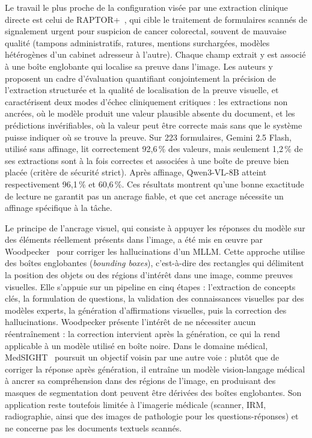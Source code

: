 Le travail le plus proche de la configuration visée par une extraction clinique directe est celui de RAPTOR+~\cite{raptorplus2026}, qui cible le traitement de formulaires scannés de signalement urgent pour suspicion de cancer colorectal, souvent de mauvaise qualité (tampons administratifs, ratures, mentions surchargées, modèles hétérogènes d'un cabinet adresseur à l'autre). Chaque champ extrait y est associé à une boîte englobante qui localise sa preuve dans l'image. Les auteurs y proposent un cadre d'évaluation quantifiant conjointement la précision de l'extraction structurée et la qualité de localisation de la preuve visuelle, et caractérisent deux modes d'échec cliniquement critiques : les extractions non ancrées, où le modèle produit une valeur plausible absente du document, et les prédictions invérifiables, où la valeur peut être correcte mais sans que le système puisse indiquer où se trouve la preuve. Sur 223 formulaires, Gemini 2.5 Flash, utilisé sans affinage, lit correctement 92,6\,\% des valeurs, mais seulement 1,2\,\% de ses extractions sont à la fois correctes et associées à une boîte de preuve bien placée (critère de sécurité strict). Après affinage, Qwen3-VL-8B atteint respectivement 96,1\,\% et 60,6\,\%. Ces résultats montrent qu'une bonne exactitude de lecture ne garantit pas un ancrage fiable, et que cet ancrage nécessite un affinage spécifique à la tâche.

Le principe de l'ancrage visuel, qui consiste à appuyer les réponses du modèle sur des éléments réellement présents dans l'image, a été mis en œuvre par Woodpecker~\cite{woodpecker2023} pour corriger les hallucinations d'un MLLM. Cette approche utilise des boîtes englobantes (\textit{bounding boxes}), c'est-à-dire des rectangles qui délimitent la position des objets ou des régions d'intérêt dans une image, comme preuves visuelles. Elle s'appuie sur un pipeline en cinq étapes : l'extraction de concepts clés, la formulation de questions, la validation des connaissances visuelles par des modèles experts, la génération d'affirmations visuelles, puis la correction des hallucinations. Woodpecker présente l'intérêt de ne nécessiter aucun réentraînement : la correction intervient après la génération, ce qui la rend applicable à un modèle utilisé en boîte noire. Dans le domaine médical, MedSIGHT~\cite{chang2026medsight} poursuit un objectif voisin par une autre voie : plutôt que de corriger la réponse après génération, il entraîne un modèle vision-langage médical à ancrer sa compréhension dans des régions de l'image, en produisant des masques de segmentation dont peuvent être dérivées des boîtes englobantes. Son application reste toutefois limitée à l'imagerie médicale (scanner, IRM, radiographie, ainsi que des images de pathologie pour les questions-réponses) et ne concerne pas les documents textuels scannés.

